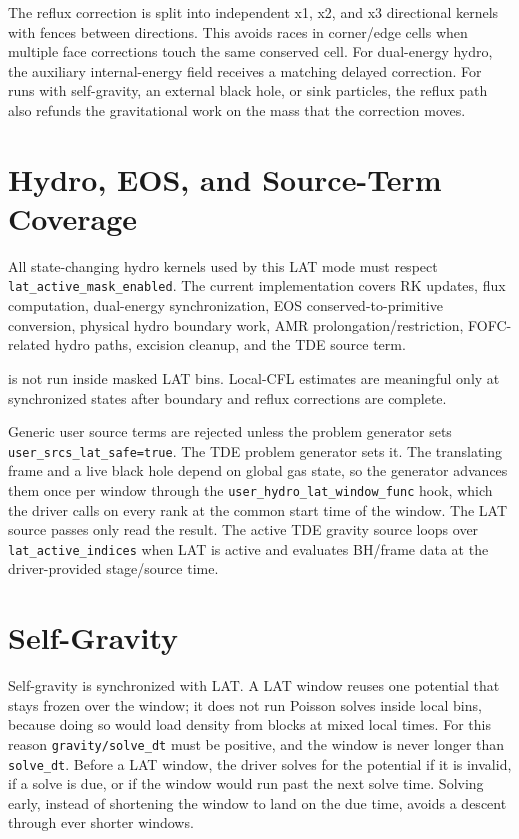 \documentclass[11pt]{article}
\begin{document}
The reflux correction is split into independent x1, x2, and x3 directional
kernels with fences between directions.  This avoids races in corner/edge
cells when multiple face corrections touch the same conserved cell.  For
dual-energy hydro, the auxiliary internal-energy field receives a matching
delayed correction.  For runs with self-gravity, an external black hole, or
sink particles, the reflux path also refunds the gravitational work on the
mass that the correction moves.

\section{Hydro, EOS, and Source-Term Coverage}

All state-changing hydro kernels used by this LAT mode must respect
\texttt{lat\_active\_mask\_enabled}.  The current implementation covers RK
updates, flux computation, dual-energy synchronization, EOS
conserved-to-primitive conversion, physical hydro boundary work, AMR
prolongation/restriction, FOFC-related hydro paths, excision cleanup, and the
TDE source term.

 is not run inside masked LAT bins.  Local-CFL
estimates are meaningful only at synchronized states after boundary and reflux
corrections are complete.

Generic user source terms are rejected unless the problem generator sets
\texttt{user\_srcs\_lat\_safe=true}.  The TDE problem generator sets it.  The
translating frame and a live black hole depend on global gas state, so the
generator advances them once per window through the
\texttt{user\_hydro\_lat\_window\_func} hook, which the driver calls on every
rank at the common start time of the window.  The LAT source passes only read
the result.  The active TDE gravity source loops over \texttt{lat\_active\_indices}
when LAT is active and evaluates BH/frame data at the driver-provided
stage/source time.

\section{Self-Gravity}

Self-gravity is synchronized with LAT.  A LAT window reuses one potential that
stays frozen over the window; it does not run Poisson solves inside local bins,
because doing so would load density from blocks at mixed local times.  For this
reason \texttt{gravity/solve\_dt} must be positive, and the window is never
longer than \texttt{solve\_dt}.  Before a LAT window, the driver solves for the
potential if it is invalid, if a solve is due, or if the window would run past
the next solve time.  Solving early, instead of shortening the window to land on
the due time, avoids a descent through ever shorter windows.
\end{document}
